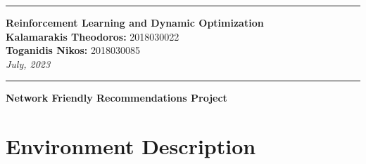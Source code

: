 \documentclass[12pt]{article}
\begin{document}
\noindent\rule{\textwidth}{2pt}
\begin{center}
\large
{\bf Reinforcement Learning and Dynamic Optimization}\\ 
\normalsize
{\bf Kalamarakis Theodoros:} 2018030022\\
{\bf Toganidis Nikos:} 2018030085\\
{\it July, 2023}\\


\end{center}
\rule{\textwidth}{.5pt}
\noindent


\justifying

   \begin{center}
       \vspace*{0.5cm}
           
       \LARGE
       \textbf{Network Friendly Recommendations Project}
         
   \end{center}

\section*{Environment Description}
\end{document}

